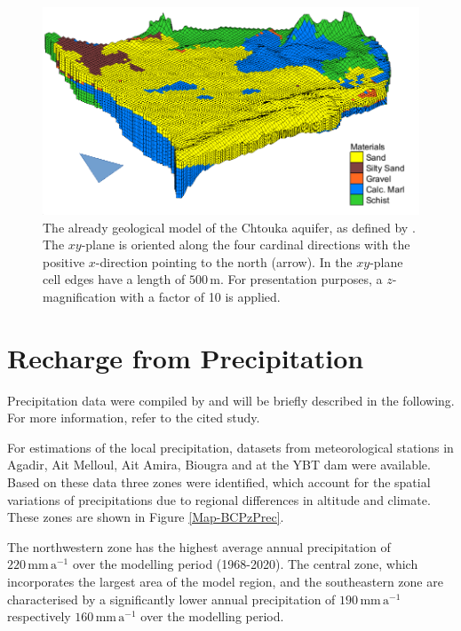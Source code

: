 \begin{figure}[h]
    \centering
    \includegraphics{./img/Fig-GeoMod.pdf}
    \caption{The already geological model of the Chtouka aquifer, as defined by \cite{Horn.2021}. The $xy$-plane is oriented along the four cardinal directions with the positive $x$-direction pointing to the north (arrow). In the $xy$-plane cell edges have a length of $500 \, \textrm{m}$. For presentation purposes, a $z$-magnification with a factor of 10 is applied.}
    \label{Fig-GeolMod}
\end{figure}


\section{Recharge from Precipitation}
\label{Sec-PrecRech}

Precipitation data were compiled by \textcite{Horn.2021} and will be briefly described in the following. 
For more information, refer to the cited study.
    
For estimations of the local precipitation, datasets from meteorological stations in Agadir, Ait Melloul, Ait Amira, Biougra and at the YBT dam were available. 
Based on these data three zones were identified, which account for the spatial variations of precipitations due to regional differences in altitude and climate. 
These zones are shown in Figure \ref{Map-BCPzPrec}.

    
The northwestern zone has the highest average annual precipitation of \linebreak $220 \, \textrm{mm} \, \textrm{a}^{-1}$ over the modelling period (1968-2020). 
The central zone, which incorporates the largest area of the model region, and the southeastern zone are characterised by a significantly lower annual precipitation of $190 \, \textrm{mm} \, \textrm{a}^{-1}$ respectively $160 \, \textrm{mm} \, \textrm{a}^{-1}$ over the modelling period.

